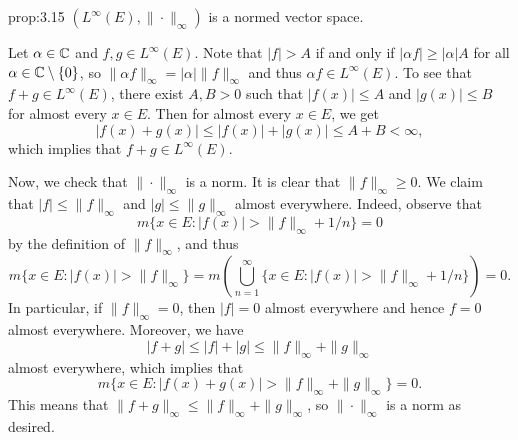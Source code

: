 \begin{prop}{prop:3.15}
    $(L^\infty(E), \|\cdot\|_\infty)$ is a normed vector space. 
\end{prop}
\begin{pf}
    Let $\alpha \in \mathbb{C}$ and $f, g \in L^\infty(E)$. Note that $|f| > A$ 
    if and only if $|\alpha f| \geq |\alpha|A$ for all $\alpha \in 
    \mathbb{C} \setminus \{0\}$, so $\|\alpha f\|_\infty = |\alpha|\|f\|_\infty$ 
    and thus $\alpha f \in L^\infty(E)$. To see that $f + g \in L^\infty(E)$, 
    there exist $A, B > 0$ such that $|f(x)| \leq A$ and $|g(x)| \leq B$
    for almost every $x \in E$. Then for almost every $x \in E$, we get 
    \[ |f(x) + g(x)| \leq |f(x)| + |g(x)| \leq A + B < \infty, \] 
    which implies that $f + g \in L^\infty(E)$. 

    Now, we check that $\|\cdot\|_\infty$ is a norm. It is clear that 
    $\|f\|_\infty \geq 0$. We claim that $|f| \leq \|f\|_\infty$ and 
    $|g| \leq \|g\|_\infty$ almost everywhere. Indeed, observe that 
    \[ m\{x \in E : |f(x)| > \|f\|_\infty + 1/n\} = 0 \] 
    by the definition of $\|f\|_\infty$, and thus 
    \[ m\{x \in E : |f(x)| > \|f\|_\infty\} = m\!\left( \bigcup_{n=1}^\infty 
    \{x \in E : |f(x)| > \|f\|_\infty + 1/n\} \right) = 0. \] 
    In particular, if $\|f\|_\infty = 0$, then $|f| = 0$ almost everywhere 
    and hence $f = 0$ almost everywhere. Moreover, we have  
    \[ |f + g| \leq |f| + |g| \leq \|f\|_\infty + \|g\|_\infty \] 
    almost everywhere, which implies that 
    \[ m\{x \in E : |f(x) + g(x)| > \|f\|_\infty + \|g\|_\infty\} = 0. \] 
    This means that $\|f + g\|_\infty \leq \|f\|_\infty + \|g\|_\infty$, 
    so $\|\cdot\|_\infty$ is a norm as desired. 
\end{pf}

